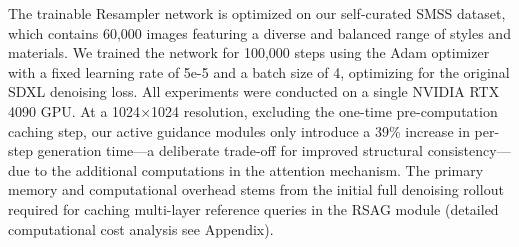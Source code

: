 The trainable Resampler network is optimized on our self-curated SMSS dataset, which contains 60,000 images featuring a diverse and balanced range of styles and materials. We trained the network for 100,000 steps using the Adam optimizer with a fixed learning rate of 5e-5 and a batch size of 4, optimizing for the original SDXL denoising loss. All experiments were conducted on a single NVIDIA RTX 4090 GPU. At a 1024$\times$1024 resolution, excluding the one-time pre-computation caching step, our active guidance modules only introduce a 39\% increase in per-step generation time—a deliberate trade-off for improved structural consistency—due to the additional computations in the attention mechanism. The primary memory and computational overhead stems from the initial full denoising rollout required for caching multi-layer reference queries in the RSAG module (detailed computational cost analysis see Appendix).